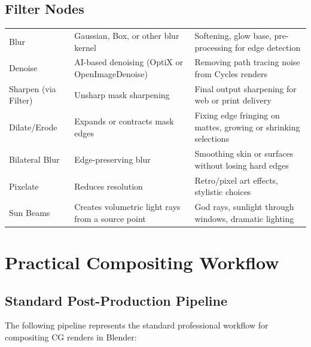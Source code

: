 \subsection{Filter Nodes}

\vspace{0.5em}
\begin{tabularx}{\textwidth}{l L{3.5cm} X}
\toprule
{}
 &  &  \\
\midrule
Blur & Gaussian, Box, or other blur kernel & Softening, glow base, pre-processing for edge detection \\
Denoise & AI-based denoising (OptiX or OpenImageDenoise) & Removing path tracing noise from Cycles renders \\
Sharpen (via Filter) & Unsharp mask sharpening & Final output sharpening for web or print delivery \\
Dilate/Erode & Expands or contracts mask edges & Fixing edge fringing on mattes, growing or shrinking selections \\
Bilateral Blur & Edge-preserving blur & Smoothing skin or surfaces without losing hard edges \\
Pixelate & Reduces resolution & Retro/pixel art effects, stylistic choices \\
Sun Beams & Creates volumetric light rays from a source point & God rays, sunlight through windows, dramatic lighting \\
\bottomrule
\end{tabularx}
\vspace{0.5em}

\section{Practical Compositing Workflow}
\label{sec:practical-compositing}

\subsection{Standard Post-Production Pipeline}

The following pipeline represents the standard professional workflow for compositing CG renders in Blender:

